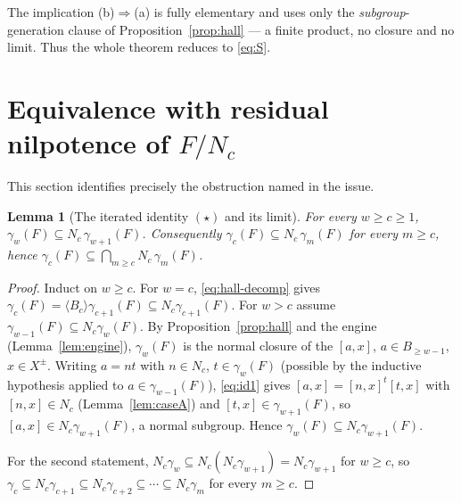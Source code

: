 \documentclass{amsart}
\newtheorem{lemma}{Lemma}
\theoremstyle{definition}
\theoremstyle{remark}
\begin{document}
\noindent The implication (b)$\Rightarrow$(a) is fully elementary and uses only the
\emph{subgroup}-generation clause of Proposition~\ref{prop:hall} --- a finite
product, no closure and no limit. Thus the whole theorem reduces to \eqref{eq:S}.

\section{Equivalence with residual nilpotence of $F/N_c$}\label{sec:resnilp}

This section identifies precisely the obstruction named in the issue.

\begin{lemma}[The iterated identity $(\star)$ and its limit]\label{lem:moddescent}
For every $w\ge c\ge1$, $\gamma_w(F)\subseteq N_c\,\gamma_{w+1}(F)$. Consequently
$\gamma_c(F)\subseteq N_c\,\gamma_m(F)$ for every $m\ge c$, hence
$\gamma_c(F)\subseteq\bigcap_{m\ge c}N_c\,\gamma_m(F)$.
\end{lemma}
\begin{proof}
Induct on $w\ge c$. For $w=c$, \eqref{eq:hall-decomp} gives
$\gamma_c(F)=\langle B_c\rangle\gamma_{c+1}(F)\subseteq N_c\gamma_{c+1}(F)$. For
$w>c$ assume $\gamma_{w-1}(F)\subseteq N_c\gamma_w(F)$. By
Proposition~\ref{prop:hall} and the engine (Lemma~\ref{lem:engine}), $\gamma_w(F)$
is the normal closure of the $[a,x]$, $a\in B_{\ge w-1}$, $x\in X^{\pm}$. Writing
$a=nt$ with $n\in N_c$, $t\in\gamma_w(F)$ (possible by the inductive hypothesis
applied to $a\in\gamma_{w-1}(F)$), \eqref{eq:id1} gives $[a,x]=[n,x]^t[t,x]$ with
$[n,x]\in N_c$ (Lemma~\ref{lem:caseA}) and $[t,x]\in\gamma_{w+1}(F)$, so
$[a,x]\in N_c\gamma_{w+1}(F)$, a normal subgroup. Hence
$\gamma_w(F)\subseteq N_c\gamma_{w+1}(F)$.

For the second statement, $N_c\gamma_w\subseteq N_c(N_c\gamma_{w+1})=N_c\gamma_{w+1}$
for $w\ge c$, so $\gamma_c\subseteq N_c\gamma_{c+1}\subseteq N_c\gamma_{c+2}\subseteq
\cdots\subseteq N_c\gamma_m$ for every $m\ge c$.
\end{proof}
\end{document}
